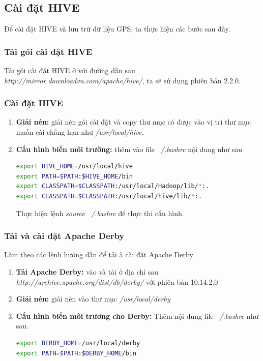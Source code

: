 	\subsection{Cài đặt HIVE}
	Để cài đặt HIVE và lưu trữ dữ liệu GPS, ta thực hiện các bước sau đây.
	\subsubsection{Tải gói cài đặt HIVE}
	Tải gói cài đặt HIVE ở với đường dẫn sau \textit{http://mirror.downloadvn.com/apache/hive/}, ta sẽ sử dụng phiên bản 2.2.0.
	\subsubsection{Cài đặt HIVE}
	\begin{enumerate}
		\item \textbf{Giải nén: }giải nén gói cài đặt và copy thư mục có được vào vị trí thư mục muốn cài chẳng hạn như \textit{/usr/local/hive}.
		\item \textbf{Cấu hình biến môi trường: }thêm vào file \textit{~/.bashrc} nội dung như sau
		\begin{lstlisting}[language=bash]
export HIVE_HOME=/usr/local/hive
export PATH=$PATH:$HIVE_HOME/bin
export CLASSPATH=$CLASSPATH:/usr/local/Hadoop/lib/*:.
export CLASSPATH=$CLASSPATH:/usr/local/hive/lib/*:.
	\end{lstlisting}
	Thực hiện lệnh \textit{source ~/.bashrc} để thực thi cấu hình.
	\end{enumerate}
	
	\subsubsection{Tải và cài đặt Apache Derby}
	Làm theo các lệnh hướng dẫn để tải à cài đặt Apache Derby
	\begin{enumerate}
		\item \textbf{Tải Apache Derby: } vào và tải ở địa chỉ sau \textit{http://archive.apache.org/dist/db/derby/} với phiên bản 10.14.2.0
		\item \textbf{Giải nén: } giải nén vào thư mục \textit{/usr/local/derby}
		\item \textbf{Cấu hình biến môi trương cho Derby:} Thêm nội dung file \textit{~/.bashrc} như sau.
		\begin{lstlisting}[language=bash]
export DERBY_HOME=/usr/local/derby
export PATH=$PATH:$DERBY_HOME/bin
		\end{lstlisting}
	\end{enumerate}
		
